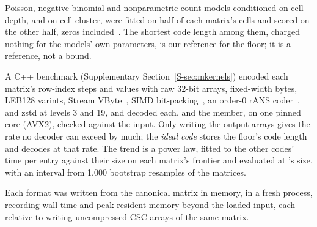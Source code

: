 Poisson, negative binomial and nonparametric count models conditioned on cell depth, and on cell cluster,
were fitted on half of each matrix's cells and scored on the other half, zeros
included~\cite{hafemeister2019normalization,townes2019feature}. The shortest code length among them, charged nothing for
the models' own parameters, is our reference for the floor; it is a reference, not a bound.

A C++ benchmark (Supplementary Section~\ref{S-sec:mkernels}) encoded each matrix's row-index steps and values with raw 32-bit arrays, fixed-width
bytes, LEB128 varints, Stream VByte~\cite{lemire2018stream}, SIMD bit-packing~\cite{lemire2015decoding}, an order-0 rANS
coder~\cite{duda2013asymmetric}, and zstd at levels 3 and 19, and decoded each, and the \sone{} member, on one pinned core
(AVX2), checked against the input. Only writing the output arrays gives the rate no decoder can exceed by much; the
\emph{ideal code} stores the floor's code length and decodes at that rate. The trend is a power law, fitted to the other
codes' time per entry against their size on each matrix's frontier and evaluated at \sone's size, with an interval from
1,000 bootstrap resamples of the matrices.

Each format was written from the canonical matrix in memory, in a fresh process, recording wall time and
peak resident memory beyond the loaded input, each relative to writing uncompressed CSC arrays of the same matrix.
